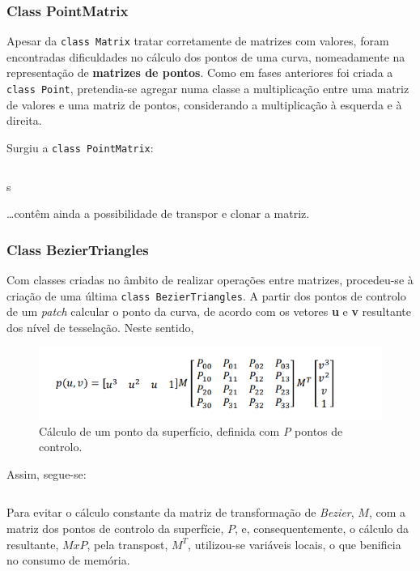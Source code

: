 \documentclass[relatorio.tex]{subfiles}
\begin{document}
\subsubsection{Class PointMatrix}
Apesar da \texttt{class Matrix} tratar corretamente de matrizes com valores, foram encontradas dificuldades no 
cálculo dos pontos de uma curva, nomeadamente na representação de \textbf{matrizes de pontos}. 
Como em fases anteriores foi criada a \texttt{class Point}, pretendia-se agregar numa classe a multiplicação entre 
uma matriz de valores e uma matriz de pontos, considerando a multiplicação à esquerda e à direita.

Surgiu a \texttt{class PointMatrix}:
\begin{code}
    \label{code:matrix.h}
    \inputminted[firstline=6, lastline=10]{cpp}{../../cartesian/PointMatrix.h}s
\end{code}
\dots contêm ainda a possibilidade de transpor e clonar a matriz.

\subsubsection{Class BezierTriangles}
Com classes criadas no âmbito de realizar operações entre matrizes, procedeu-se à criação de uma última 
\texttt{class BezierTriangles}.
A partir dos pontos de controlo de um \textit{patch} calcular o ponto da curva, de acordo com os vetores \textbf{u}
e \textbf{v} resultante dos nível de tesselação.
Neste sentido, 
\begin{figure}
    \centering
    \includegraphics[width=\linewidth]{assets/bezier_patches_point.png}
    \caption{Cálculo de um ponto da superfício, definida com \textit{P} pontos de controlo.}
    \label{fig:bezier_point}
\end{figure}

Assim, segue-se:
\begin{code}
    \label{code:BezierTriangles.h}
    \inputminted[firstline=5, lastline=15]{cpp}{../../cartesian/BezierTriangles.h}
\end{code}

Para evitar o cálculo constante da matriz de transformação de \textit{Bezier}, $M$, com a matriz dos pontos de controlo da superfície, $P$,
e, consequentemente, o cálculo da resultante, $MxP$, pela transpost, $M^T$, utilizou-se variáveis locais, o que benificia 
no consumo de memória.
\end{document}
